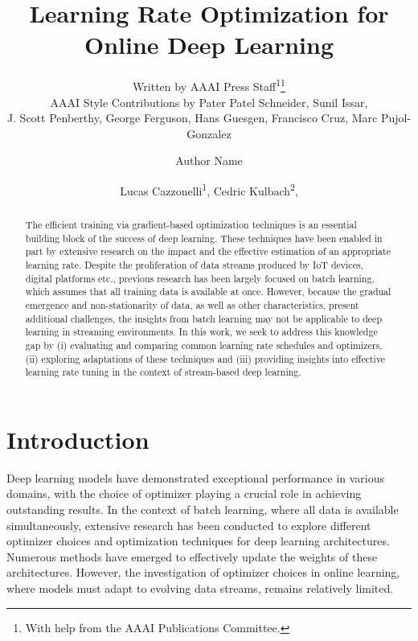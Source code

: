 \documentclass[letterpaper]{article} %
\author{
    Written by AAAI Press Staff\textsuperscript{\rm 1}\thanks{With help from the AAAI Publications Committee.}\\
    AAAI Style Contributions by Pater Patel Schneider,
    Sunil Issar,\\
    J. Scott Penberthy,
    George Ferguson,
    Hans Guesgen,
    Francisco Cruz\equalcontrib,
    Marc Pujol-Gonzalez\equalcontrib}
\author{
    Author Name
}
\title{Learning Rate Optimization for Online Deep Learning}
\author{
    Lucas Cazzonelli\textsuperscript{\rm 1},
    Cedric Kulbach\textsuperscript{\rm 2},
}
\begin{document}
\maketitle


\begin{abstract}

	\noindent The efficient training via gradient-based optimization techniques is an essential building block of the success of deep learning.
	These techniques have been enabled in part by extensive research on the impact and the effective estimation of an appropriate learning rate.
	Despite the proliferation of data streams produced by IoT devices, digital platforms etc., previous research has been largely focused on batch learning, which assumes that all training data is available at once.
	However, because the gradual emergence and non-stationarity of data, as well as other characteristics, present additional challenges, the insights from batch learning may not be applicable to deep learning in streaming environments.
	In this work, we seek to address this knowledge gap by (i) evaluating and comparing common learning rate schedules and optimizers, (ii) exploring adaptations of these techniques and (iii) providing insights into effective learning rate tuning in the context of stream-based deep learning.



\end{abstract}

\section{Introduction}
Deep learning models have demonstrated exceptional performance in various domains, with the choice of optimizer playing a crucial role in achieving outstanding results.
In the context of batch learning, where all data is available simultaneously, extensive research has been conducted to explore different optimizer choices and optimization techniques for deep learning architectures.
Numerous methods have emerged to effectively update the weights of these architectures.
However, the investigation of optimizer choices in online learning, where models must adapt to evolving data streams, remains relatively limited.
\end{document}
